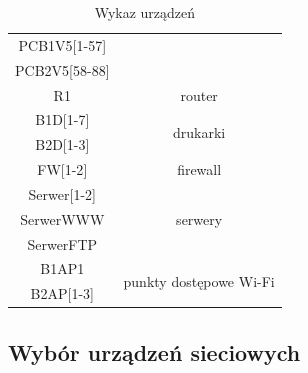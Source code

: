 \documentclass[a4paper, 12pt]{article}
\begin{document}
\begin{table}[H]
\begin{tabular}{|c|c|}
PCB1V5{[}1-57{]}          &                                                              \\ \cline{1-1}
PCB2V5{[}58-88{]}         &                                                              \\ \hline
R1                        & router                                                       \\ \hline
B1D{[}1-7{]}              & \multirow{2}{*}{drukarki}                                    \\ \cline{1-1}
B2D{[}1-3{]}              &                                                              \\ \hline
FW{[}1-2{]}               & firewall                                                     \\ \hline
Serwer{[}1-2{]}           & \multirow{3}{*}{serwery}                                     \\ \cline{1-1}
SerwerWWW                 &                                                              \\ \cline{1-1}
SerwerFTP                 &                                                              \\ \hline
B1AP1                     & \multicolumn{1}{l|}{\multirow{2}{*}{punkty dostępowe Wi-Fi}} \\ \cline{1-1}
B2AP{[}1-3{]}             & \multicolumn{1}{l|}{}                                        \\ \hline
\end{tabular}
\caption{Wykaz urządzeń}
\end{table}

\subsection{Wybór urządzeń sieciowych}
\end{document}
